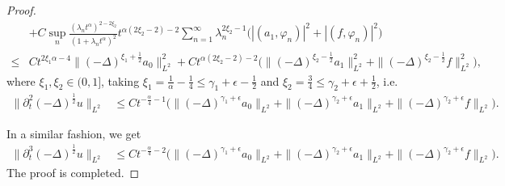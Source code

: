 \documentclass[10pt,a4paper]{amsart}
\begin{document}
\begin{proof}
\begin{align*}
&+C\sup_n\frac{(\lambda_nt^\alpha)^{2-2\xi_2}}{(1+\lambda_nt^\alpha)^2}t^{\alpha(2\xi_2-2)-2}\sum_{n=1}^\infty \lambda_n^{2\xi_2-1}\Big(|(a_1, \varphi_n)|^2+|(f, \varphi_n)|^2\Big)\\
\le& Ct^{2\xi_1\alpha-4}\|(-\Delta)^{\xi_1+\frac12}a_0\|_{L^2}^2+ Ct^{\alpha(2\xi_2-2)-2}\Big(\|(-\Delta)^{\xi_2-\frac12}a_1\|_{L^2}^2+\|(-\Delta)^{\xi_2-\frac12}f\|_{L^2}^2\Big),
\end{align*}
where $\xi_1,\xi_2\in(0,1]$, taking $\xi_1=\frac{1}{\alpha}-\frac14\le\gamma_1+\epsilon-\frac12$ and $\xi_2=\frac34\leq\gamma_2+\epsilon+\frac12$, i.e.
\begin{align*}
\|\partial_t^2(-\Delta)^{\frac12}u\|_{L^2}
&\le Ct^{-\frac{\alpha}{4}-1}\Big(\|(-\Delta)^{\gamma_1+\epsilon}a_0\|_{L^2}
+\|(-\Delta)^{\gamma_2+\epsilon}a_1\|_{L^2}+\|(-\Delta)^{\gamma_2+\epsilon}f\|_{L^2}\Big).
\end{align*}

In a similar fashion, we get
\begin{align*}
\|\partial_t^3(-\Delta)^{\frac12}u\|_{L^2}
&\le Ct^{-\frac{\alpha}{4}-2}\Big(\|(-\Delta)^{\gamma_1+\epsilon}a_0\|_{L^2}
+\|(-\Delta)^{\gamma_2+\epsilon}a_1\|_{L^2}+\|(-\Delta)^{\gamma_2+\epsilon}f\|_{L^2}\Big).
\end{align*}
The proof is completed.
\end{proof}
\end{document}
